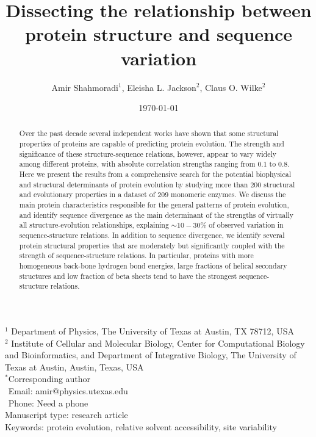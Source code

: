 \documentclass[12pt]{article}
\title{Dissecting the relationship between protein structure and sequence variation}
\author{Amir Shahmoradi$^1$, Eleisha L. Jackson$^2$, Claus O. Wilke$^2$}%
\begin{document}
\date{\today}
\maketitle


\noindent
$^1$ Department of Physics, The University of Texas at Austin, TX 78712, USA \\
$^2$ Institute of Cellular and Molecular Biology, Center for Computational Biology and Bioinformatics, and Department of Integrative Biology, The University of Texas at Austin, Austin, Texas, USA\\

\bigskip
\noindent
$^*$Corresponding author\\
$\phantom{^*}$Email: amir@physics.utexas.edu\\
$\phantom{^*}$Phone:{ \color{red} Need a phone} \\

\bigskip
\noindent
Manuscript type: research article\\
\bigskip
\noindent  Keywords: protein evolution, relative solvent accessibility, site variability


\begin{abstract}
    Over the past decade several independent works have shown that some structural properties of proteins are capable of predicting protein evolution. The strength and significance of these structure-sequence relations, however, appear to vary widely among different proteins, with absolute correlation strengths ranging from $0.1$ to $0.8$. Here we present the results from a comprehensive search for the potential biophysical and structural determinants of protein evolution by studying more than $200$ structural and evolutionary properties in a dataset of $209$ monomeric enzymes. We discuss the main protein characteristics responsible for the general patterns of protein evolution, and identify sequence divergence as the main determinant of the strengths of virtually all structure-evolution relationships, explaining $\sim10-30\%$ of observed variation in sequence-structure relations. In addition to sequence divergence, we identify several protein structural properties that are moderately but significantly coupled with the strength of sequence-structure relations. In particular, proteins with more homogeneous back-bone hydrogen bond energies, large fractions of helical secondary structures and low fraction of beta sheets tend to have the strongest sequence-structure relations.

\end{abstract}
\vfill
\vfill
\def\thefootnote{\fnsymbol{footnote}}
\setcounter{footnote}{0}
%
\end{document}
